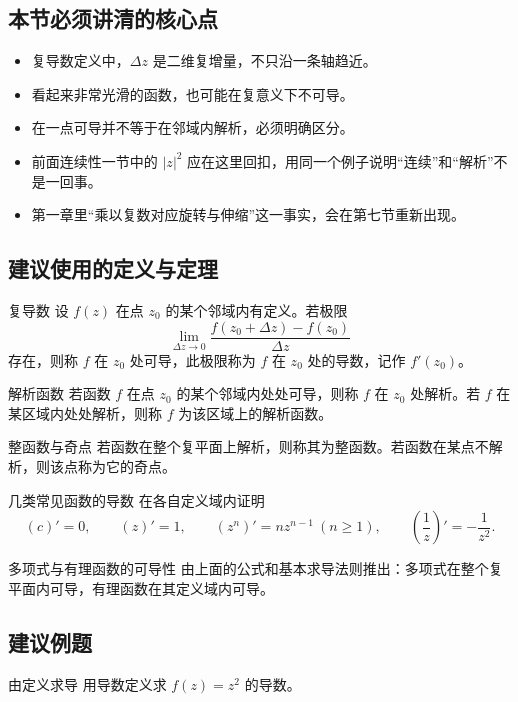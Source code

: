 \subsection*{本节必须讲清的核心点}
\begin{itemize}
    \item 复导数定义中，$\Delta z$ 是二维复增量，不只沿一条轴趋近。
    \item 看起来非常光滑的函数，也可能在复意义下不可导。
    \item 在一点可导并不等于在邻域内解析，必须明确区分。
    \item 前面连续性一节中的 $|z|^2$ 应在这里回扣，用同一个例子说明``连续''和``解析''不是一回事。
    \item 第一章里``乘以复数对应旋转与伸缩''这一事实，会在第七节重新出现。
\end{itemize}

\subsection*{建议使用的定义与定理}
\begin{dingliyi}{复导数}{}
设 $f(z)$ 在点 $z_0$ 的某个邻域内有定义。若极限
\[
    \lim_{\Delta z\to 0}\frac{f(z_0+\Delta z)-f(z_0)}{\Delta z}
\]
存在，则称 $f$ 在 $z_0$ 处可导，此极限称为 $f$ 在 $z_0$ 处的导数，记作 $f'(z_0)$。
\end{dingliyi}

\begin{dingliyi}{解析函数}{}
若函数 $f$ 在点 $z_0$ 的某个邻域内处处可导，则称 $f$ 在 $z_0$ 处解析。若 $f$ 在某区域内处处解析，则称 $f$ 为该区域上的解析函数。
\end{dingliyi}

\begin{dingliyi}{整函数与奇点}{}
若函数在整个复平面上解析，则称其为整函数。若函数在某点不解析，则该点称为它的奇点。
\end{dingliyi}

\begin{dingli}{几类常见函数的导数}{}
在各自定义域内证明
\[
    (c)'=0,\qquad (z)'=1,\qquad (z^n)'=nz^{n-1}\ (n\ge 1),\qquad
    \left(\frac{1}{z}\right)'=-\frac{1}{z^2}.
\]
\end{dingli}

\begin{tuilun}{多项式与有理函数的可导性}{}
由上面的公式和基本求导法则推出：多项式在整个复平面内可导，有理函数在其定义域内可导。
\end{tuilun}

\subsection*{建议例题}
\begin{lizi}{由定义求导}{}
用导数定义求 $f(z)=z^2$ 的导数。
\end{lizi}

